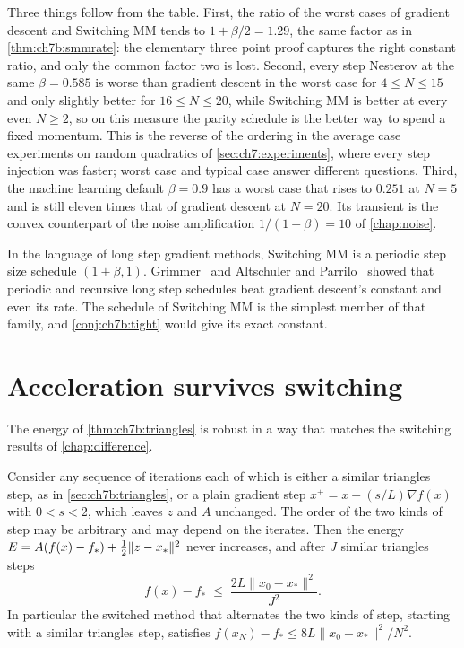 Three things follow from the table. First, the ratio of the worst cases of
gradient descent and Switching MM tends to $1+\beta/2=1.29$, the same factor as
in \cref{thm:ch7b:smmrate}: the elementary three point proof captures the
right constant ratio, and only the common factor two is lost. Second, every
step Nesterov at the same $\beta=0.585$ is worse than gradient descent in the
worst case for $4\le N\le15$ and only slightly better for $16\le N\le20$, while Switching MM
is better at every even $N\ge2$, so on this measure the parity schedule is the better
way to spend a fixed momentum. This
is the reverse of the ordering in the average case experiments on random
quadratics of \cref{sec:ch7:experiments}, where every step injection was
faster; worst case and typical case answer different questions. Third, the
machine learning default $\beta=0.9$ has a worst case that rises to $0.251$ at
$N=5$ and is still eleven times that of gradient descent at $N=20$. Its transient
is the convex counterpart of the noise amplification $1/(1-\beta)=10$ of
\cref{chap:noise}.

In the language of long step gradient methods, Switching MM is a periodic step
size schedule $(1+\beta,1)$. Grimmer~\cite{grimmer2023} and Altschuler and
Parrilo~\cite{altschuler2024} showed that periodic and recursive long step
schedules beat gradient descent's constant and even its rate. The schedule of
Switching MM is the simplest member of that family, and
\cref{conj:ch7b:tight} would give its exact constant.

\section{Acceleration survives switching}\label{sec:ch7b:switching}

The energy of \cref{thm:ch7b:triangles} is robust in a way that matches the
switching results of \cref{chap:difference}.

\begin{proposition}\label{prop:ch7b:switch}
Consider any sequence of iterations each of which is either a similar
triangles step, as in \cref{sec:ch7b:triangles}, or a plain gradient step
$x^+=x-(s/L)\nabla f(x)$ with $0<s<2$, which leaves $z$ and $A$ unchanged. The
order of the two kinds of step may be arbitrary and may depend on the
iterates. Then the energy $E=A(f(x)-f_*)+\tfrac{1}{2}\|z-x_*\|^2$ never increases,
and after $J$ similar triangles steps
\[
  f(x)-f_*\;\le\;\frac{2L\|x_0-x_*\|^2}{J^2}.
\]
In particular the switched method that alternates the two kinds of step,
starting with a similar triangles step, satisfies $f(x_N)-f_*\le8L\|x_0-x_*\|^2/N^2$.
\end{proposition}

